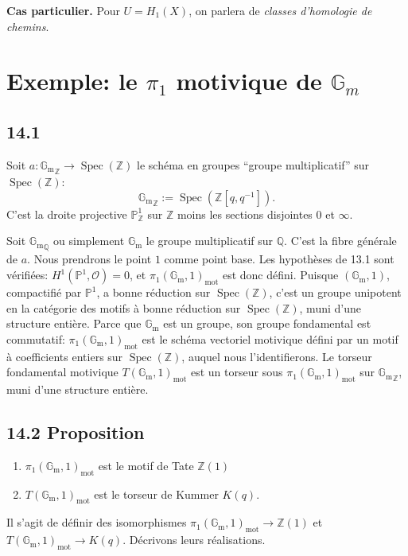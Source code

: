\documentclass[12pt,a4paper]{article}
\theoremstyle{plain}
\theoremstyle{definition}
\theoremstyle{remark}
\DeclareMathOperator{\Spec}{Spec}
\newcommand*{\Gm}{\mathbb{G}_\mathrm{m}}
\newcommand{\cO}{\mathcal{O}}
\newcommand{\bZ}{\mathbb{Z}}
\newcommand{\bQ}{\mathbb{Q}}
\newcommand{\bP}{\mathbb{P}}
\newcommand{\mot}{\mathrm{mot}}
\begin{document}
\textbf{Cas particulier.} Pour $U = H_1(X)$, on parlera de \emph{classes d'homologie de chemins}.


\section{Exemple: le $\pi_1$ motivique de $\mathbb{G}_m$}\label{sec:14}

\subsection*{14.1}

Soit $a : {\Gm}_{\bZ} \to \Spec(\bZ)$ le schéma en groupes ``groupe multiplicatif'' sur $\Spec(\bZ)$:
\[
{\Gm}_{\bZ} := \Spec(\bZ[q, q^{-1}]).
\]
C'est la droite projective $\bP^1_{\bZ}$ sur $\bZ$ moins les sections disjointes $0$ et $\infty$.

Soit ${\Gm}_{\bQ}$ ou simplement $\Gm$ le groupe multiplicatif sur $\bQ$. C'est la fibre générale de $a$. Nous prendrons le point $1$ comme point base. Les hypothèses de 13.1 sont vérifiées: $H^1(\bP^1, \cO) = 0$, et $\pi_1(\Gm, 1)_{\mot}$ est donc défini. Puisque $(\Gm, 1)$, compactifié par $\bP^1$, a bonne réduction sur $\Spec(\bZ)$, c'est un groupe unipotent en la catégorie des motifs à bonne réduction sur $\Spec(\bZ)$, muni d'une structure entière. Parce que $\Gm$ est un groupe, son groupe fondamental est commutatif: $\pi_1(\Gm, 1)_{\mot}$ est le schéma vectoriel motivique défini par un motif à coefficients entiers sur $\Spec(\bZ)$, auquel nous l'identifierons. Le torseur fondamental motivique $T(\Gm, 1)_{\mot}$ est un torseur sous $\pi_1(\Gm, 1)_{\mot}$ sur ${\Gm}_{\bZ}$, muni d'une structure entière.

\subsection*{14.2 Proposition}
\begin{enumerate}[label=(\roman*), nosep]
\item $\pi_1(\Gm, 1)_{\mot}$ est le motif de Tate $\bZ(1)$
\item $T(\Gm, 1)_{\mot}$ est le torseur de Kummer $K(q)$.
\end{enumerate}

Il s'agit de définir des isomorphismes $\pi_1(\Gm, 1)_{\mot} \to \bZ(1)$ et $T(\Gm, 1)_{\mot} \to K(q)$. Décrivons leurs réalisations.
\end{document}
